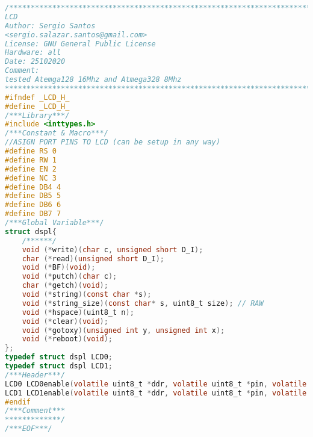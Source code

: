 \begin{lstlisting}[language=C]
/************************************************************************
LCD
Author: Sergio Santos 
<sergio.salazar.santos@gmail.com>
License: GNU General Public License
Hardware: all
Date: 25102020
Comment:
tested Atemga128 16Mhz and Atmega328 8Mhz
************************************************************************/
#ifndef _LCD_H_
#define _LCD_H_
/***Library***/
#include <inttypes.h>
/***Constant & Macro***/
//ASIGN PORT PINS TO LCD (can be setup in any way)
#define RS 0
#define RW 1
#define EN 2
#define NC 3
#define DB4 4
#define DB5 5
#define DB6 6
#define DB7 7
/***Global Variable***/
struct dspl{
	/******/
	void (*write)(char c, unsigned short D_I);
	char (*read)(unsigned short D_I);
	void (*BF)(void);
	void (*putch)(char c);
	char (*getch)(void);
	void (*string)(const char *s);
	void (*string_size)(const char* s, uint8_t size); // RAW
	void (*hspace)(uint8_t n);
	void (*clear)(void);
	void (*gotoxy)(unsigned int y, unsigned int x);
	void (*reboot)(void);
};
typedef struct dspl LCD0;
typedef struct dspl LCD1;
/***Header***/
LCD0 LCD0enable(volatile uint8_t *ddr, volatile uint8_t *pin, volatile uint8_t *port);
LCD1 LCD1enable(volatile uint8_t *ddr, volatile uint8_t *pin, volatile uint8_t *port);
#endif
/***Comment***
*************/
/***EOF***/
\end{lstlisting}
